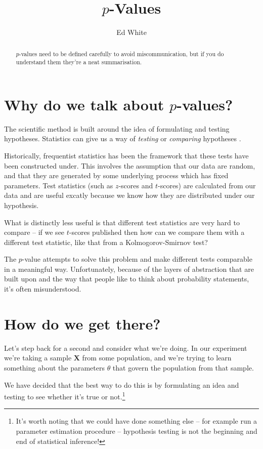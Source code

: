 \documentclass{tufte-handout}
\title{$p$-Values}
\author{Ed White}
\date{}
\theoremstyle{plain}
\theoremstyle{definition}
\newcommand{\XX}{\mathbf{X}}
\begin{document}
\maketitle

\begin{abstract}
    \noindent
    $p$-values need to be defined carefully to avoid miscommunication, but if you do understand them they're a neat summarisation.
\end{abstract}

\section{Why do we talk about $p$-values?}

The scientific method is built around the idea of formulating and testing hypotheses.
Statistics can give us a way of \textit{testing} or \textit{comparing} hypotheses \cite{casella2021statistical}.

Historically, frequentist statistics has been the framework that these tests have been constructed under.
This involves the assumption that our data are random, and that they are generated by some underlying process which has fixed parameters.
Test statistics (such as $z$-scores and $t$-scores) are calculated from our data and are useful excatly because we know how they are distributed under our hypothesis.

What is distinctly less useful is that different test statistics are very hard to compare -- if we see $t$-scores published then how can we compare them with a different test statistic, like that from a Kolmogorov-Smirnov test?

The $p$-value attempts to solve this problem and make different tests comparable in a meaningful way.
Unfortunately, because of the layers of abstraction that are built upon and the way that people like to think about probability statements, it's often misunderstood.

\section{How do we get there?}

Let's step back for a second and consider what we're doing.
In our experiment we're taking a sample $\XX$ from some population, and we're trying to learn something about the parameters $\theta$ that govern the population from that sample.

We have decided that the best way to do this is by formulating an idea and testing to see whether it's true or not.\footnote{It's worth noting that we could have done something else -- for example run a parameter estimation procedure -- hypothesis testing is not the beginning and end of statistical inference!}
\end{document}
